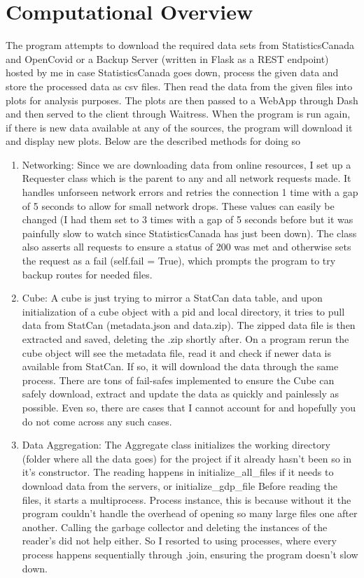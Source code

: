 \documentclass[fontsize=11pt]{article}
\begin{document}
    \section*{Computational Overview}
    The program attempts to download the required data sets from StatisticsCanada and OpenCovid or a Backup Server (written in Flask as a REST endpoint) hosted by me in case StatisticsCanada goes down, process the given data and store the processed data as csv files. Then read the data from the given files into plots for analysis purposes. The plots are then passed to a WebApp through Dash and then served to the client through Waitress. When the program is run again, if there is new data available at any of the sources, the program will download it and display new plots. Below are the described methods for doing so
    \begin{enumerate}
        \item Networking: Since we are downloading data from online resources, I set up a Requester class which is the parent to any and all network requests made. It handles unforseen network errors and retries the connection 1 time with a gap of 5 seconds to allow for small network drops. These values can easily be changed (I had them set to 3 times with a gap of 5 seconds before but it was painfully slow to watch since StatisticsCanada has just been down). The class also asserts all requests to ensure a status of 200 was met and otherwise sets the request as a fail (self.fail = True), which prompts the program to try backup routes for needed files.
        \item Cube: A cube is just trying to mirror a StatCan data table, and upon initialization of a cube object with a pid and local directory, it tries to pull data from StatCan (metadata.json and data.zip). The zipped data file is then extracted and saved, deleting the .zip shortly after. On a program rerun the cube object will see the metadata file, read it and check if newer data is available from StatCan. If so, it will download the data through the same process. There are tons of fail-safes implemented to ensure the Cube can safely download, extract and update the data as quickly and painlessly as possible. Even so, there are cases that I cannot account for and hopefully you do not come across any such cases.
        \item Data Aggregation: The Aggregate class initializes the working directory (folder where all the data goes) for the project if it already hasn't been so in it's constructor. The reading happens in initialize\_all\_files if it needs to download data from the servers, or initialize\_gdp\_file Before reading the files, it starts a multiprocess. Process instance, this is because without it the program couldn't handle the overhead of opening so many large files one after another. Calling the garbage collector and deleting the instances of the reader's did not help either. So I resorted to using processes, where every process happens sequentially through .join, ensuring the program doesn't slow down.

\end{enumerate}
\end{document}

